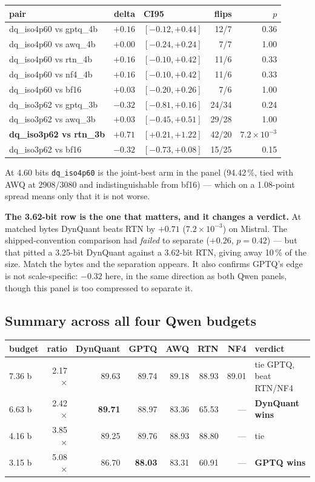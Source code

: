 \documentclass[11pt]{article}
\newcommand{\x}{\texorpdfstring{$\times$}{x}}
\newcommand{\pct}{\,\%}
\newcommand{\code}[1]{\texttt{#1}}
\newcommand{\e}[2]{$#1\!\times\!10^{#2}$}
\newcommand{\best}[1]{\textbf{#1}}
\begin{document}
\begin{center}\small
\begin{tabular}{@{}lrlrr@{}}
\toprule
pair & delta & CI95 & flips & $p$ \\
\midrule
dq\_iso4p60 vs gptq\_4b & $+0.16$ & $[-0.12, +0.44]$ & 12/7 & 0.36 \\
dq\_iso4p60 vs awq\_4b & $+0.00$ & $[-0.24, +0.24]$ & 7/7 & 1.00 \\
dq\_iso4p60 vs rtn\_4b & $+0.16$ & $[-0.10, +0.42]$ & 11/6 & 0.33 \\
dq\_iso4p60 vs nf4\_4b & $+0.16$ & $[-0.10, +0.42]$ & 11/6 & 0.33 \\
dq\_iso4p60 vs bf16 & $+0.03$ & $[-0.20, +0.26]$ & 7/6 & 1.00 \\
\midrule
dq\_iso3p62 vs gptq\_3b & $-0.32$ & $[-0.81, +0.16]$ & 24/34 & 0.24 \\
dq\_iso3p62 vs awq\_3b & $+0.03$ & $[-0.45, +0.51]$ & 29/28 & 1.00 \\
\textbf{dq\_iso3p62 vs rtn\_3b} & \best{$+0.71$} & $[+0.21, +1.22]$ & 42/20 & \best{\e{7.2}{-3}} \\
dq\_iso3p62 vs bf16 & $-0.32$ & $[-0.73, +0.08]$ & 15/25 & 0.15 \\
\bottomrule
\end{tabular}
\end{center}

At 4.60 bits \code{dq\_iso4p60} is the joint-best arm in the panel (94.42\pct, tied with AWQ at
2908/3080 and indistinguishable from bf16) --- which on a 1.08-point spread means only that it is
not worse.

\textbf{The 3.62-bit row is the one that matters, and it changes a verdict.} At matched bytes
DynQuant beats RTN by \best{$+0.71$} (\e{7.2}{-3}) on Mistral. The shipped-convention comparison
had \emph{failed} to separate ($+0.26$, $p = 0.42$) --- but that pitted a 3.25-bit DynQuant
against a 3.62-bit RTN, giving away 10\pct{} of the size. Match the bytes and the separation
appears. It also confirms GPTQ's edge is not scale-specific: $-0.32$ here, in the same direction
as both Qwen panels, though this panel is too compressed to separate it.

\subsection{Summary across all four Qwen budgets}

\begin{center}\small
\begin{tabular}{@{}lrrrrrrl@{}}
\toprule
budget & ratio & DynQuant & GPTQ & AWQ & RTN & NF4 & verdict \\
\midrule
7.36 b & 2.17\x & 89.63 & 89.74 & 89.18 & 88.93 & 89.01 & tie GPTQ, beat RTN/NF4 \\
\rowcolor{winbg}
6.63 b & 2.42\x & \best{89.71} & 88.97 & 83.36 & 65.53 & --- & \textbf{DynQuant wins} \\
4.16 b & 3.85\x & 89.25 & 89.76 & 88.93 & 88.80 & --- & tie \\
3.15 b & 5.08\x & 86.70 & \best{88.03} & 83.31 & 60.91 & --- & \textbf{GPTQ wins} \\
\bottomrule
\end{tabular}
\end{center}
\end{document}
